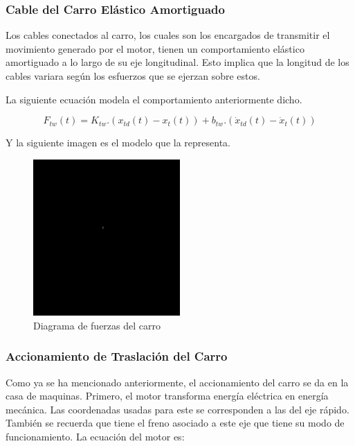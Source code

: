 \subsubsection{Cable del Carro Elástico Amortiguado}

Los cables conectados al carro, los cuales son los encargados de
transmitir el movimiento generado por el motor, tienen un comportamiento
elástico amortiguado a lo largo de su eje longitudinal. Esto implica que
la longitud de los cables variara según los esfuerzos que se ejerzan
sobre estos.

La siguiente ecuación modela el comportamiento anteriormente dicho.

\begin{equation}
    F_{tw}(t) = K_{tw}.(x_{td}(t) - x_t(t)) + b_{tw}.(\dot{x}_{td}(t) - \dot{x}_t(t))
\end{equation}

Y la siguiente imagen es el modelo que la representa.

\begin{figure}[H]
    \centering
    \includegraphics[width=0.5\textwidth]{img/NADA.png}
    \caption{Diagrama de fuerzas del carro}
\end{figure}

\subsubsection{Accionamiento de Traslación del Carro}

Como ya se ha mencionado anteriormente, el accionamiento del carro
se da en la casa de maquinas. Primero, el motor transforma energía 
eléctrica en energía mecánica. Las coordenadas usadas para este se 
corresponden a las del eje rápido. También se recuerda que tiene el
freno asociado a este eje que tiene su modo de funcionamiento. La 
ecuación del motor es: 

